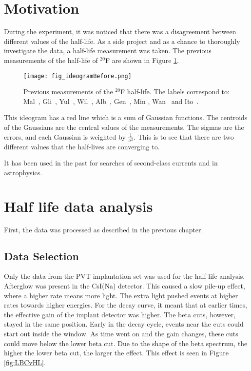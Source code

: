 \documentclass[main.tex]{subfiles}
\begin{document}
\section{Motivation}
During the experiment, it was noticed that there was a disagreement between different values of the half-life.
As a side project and as a chance to thoroughly investigate the data, a half-life measurement was taken. 
The previous measurements of the half-life of $^{20}$F are shown in Figure \ref{fig:IDBefore}.

\begin{figure}[!htb]
	\centerline{\texttt{[image: fig\_ideogramBefore.png]}}
	\caption{Previous measurements of  the $^{20}$F half-life.
		 The labels correspond to: Mal~\cite{Mal62}, Gli~\cite{Gli63},
		Yul~\cite{Yul67}, Wil~\cite{Wil70}, Alb~\cite{Alb75}, Gen~\cite{Gen76},
		Min \cite{Min87}, Wan~\cite{Wan92} and Ito~\cite{Ito95}.}
	\label{fig:IDBefore}
\end{figure}

This ideogram has a red line which is a sum of Gaussian functions.
The centroids of the Gaussians are the central values of the measurements.
The sigmas are the errors, and each Gaussian is weighted by $\frac{1}{\sigma^{2}}$.
This is to see that there are two different values that the half-lives are converging to.

It has been used in the past for searches of second-class currents and in astrophysics.

\section{Half life data analysis}
\label{sec:analysis}
First, the data was processed as described in the previous chapter.

\subsection{Data Selection}
Only the data from the PVT implantation set was used for the half-life analysis.
Afterglow was present in the CsI(Na) detector.
This caused a slow pile-up effect, where a higher rate means more light.
The extra light pushed events at higher rates towards higher energies.
For the decay curve, it meant that at earlier times, the effective gain of the implant detector was higher.
The beta cuts, however, stayed in the same position.
Early in the decay cycle, events near the cuts could start out inside the window.
As time went on and the gain changes, these cuts could move below the lower beta cut. 
Due to the shape of the beta spectrum, the higher the lower beta cut, the larger the effect.
This effect is seen in Figure \ref{fig:LBCvHL}.
\end{document}
